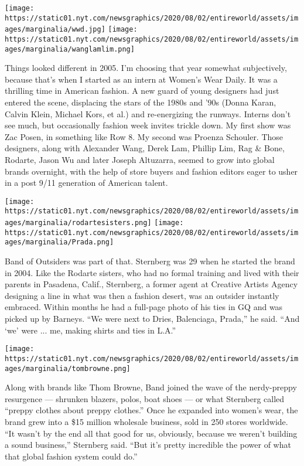 \texttt{[image: https://static01.nyt.com/newsgraphics/2020/08/02/entireworld/assets/images/marginalia/wwd.jpg]}
\texttt{[image: https://static01.nyt.com/newsgraphics/2020/08/02/entireworld/assets/images/marginalia/wanglamlim.png]}

Things looked different in 2005. I'm choosing that year somewhat
subjectively, because that's when I started as an intern at Women's Wear
Daily. It was a thrilling time in American fashion. A new guard of young
designers had just entered the scene, displacing the stars of the 1980s
and '90s (Donna Karan, Calvin Klein, Michael Kors, et al.) and
re-energizing the runways. Interns don't see much, but occasionally
fashion week invites trickle down. My first show was Zac Posen, in
something like Row 8. My second was Proenza Schouler. Those designers,
along with Alexander Wang, Derek Lam, Phillip Lim, Rag \& Bone, Rodarte,
Jason Wu and later Joseph Altuzarra, seemed to grow into global brands
overnight, with the help of store buyers and fashion editors eager to
usher in a post 9/11 generation of American talent.

\texttt{[image: https://static01.nyt.com/newsgraphics/2020/08/02/entireworld/assets/images/marginalia/rodartesisters.png]}
\texttt{[image: https://static01.nyt.com/newsgraphics/2020/08/02/entireworld/assets/images/marginalia/Prada.png]}

Band of Outsiders was part of that. Sternberg was 29 when he started the
brand in 2004. Like the Rodarte sisters, who had no formal training and
lived with their parents in Pasadena, Calif., Sternberg, a former agent
at Creative Artists Agency designing a line in what was then a fashion
desert, was an outsider instantly embraced. Within months he had a
full-page photo of his ties in GQ and was picked up by Barneys. ``We
were next to Dries, Balenciaga, Prada,'' he said. ``And `we' were ...
me, making shirts and ties in L.A.''

\texttt{[image: https://static01.nyt.com/newsgraphics/2020/08/02/entireworld/assets/images/marginalia/tombrowne.png]}

Along with brands like Thom Browne, Band joined the wave of the
nerdy-preppy resurgence --- shrunken blazers, polos, boat shoes --- or
what Sternberg called ``preppy clothes about preppy clothes.'' Once he
expanded into women's wear, the brand grew into a \$15 million wholesale
business, sold in 250 stores worldwide. ``It wasn't by the end all that
good for us, obviously, because we weren't building a sound business,''
Sternberg said. ``But it's pretty incredible the power of what that
global fashion system could do.''

